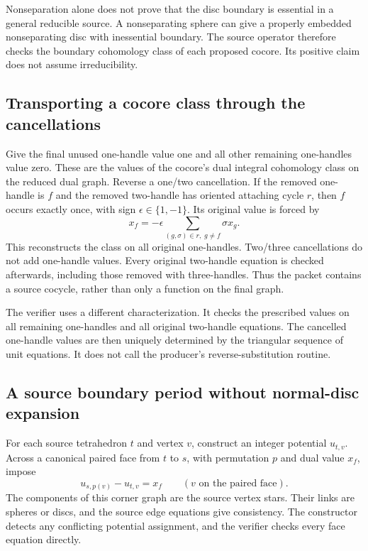 Nonseparation alone does not prove that the disc boundary is essential in a
general reducible source. A nonseparating sphere can give a properly embedded
nonseparating disc with inessential boundary. The source operator therefore
checks the boundary cohomology class of each proposed cocore. Its positive
claim does not assume irreducibility.

\subsection{Transporting a cocore class through the cancellations}

Give the final unused one-handle value one and all other remaining
one-handles value zero. These are the values of the cocore's dual integral
cohomology class on the reduced dual graph. Reverse a one/two cancellation.
If the removed one-handle is $f$ and the removed two-handle has oriented
attaching cycle $r$, then $f$ occurs exactly once, with sign
$\epsilon\in\{1,-1\}$. Its original value is forced by
\[
 x_f=-\epsilon\sum_{(g,\sigma)\in r,\;g\ne f}\sigma x_g.
\]
This reconstructs the class on all original one-handles. Two/three
cancellations do not add one-handle values. Every original two-handle
equation is checked afterwards, including those removed with three-handles.
Thus the packet contains a source cocycle, rather than only a function on
the final graph.

The verifier uses a different characterization. It checks the prescribed
values on all remaining one-handles and all original two-handle equations.
The cancelled one-handle values are then uniquely determined by the
triangular sequence of unit equations. It does not call the producer's
reverse-substitution routine.

\subsection{A source boundary period without normal-disc expansion}

For each source tetrahedron $t$ and vertex $v$, construct an integer potential
$u_{t,v}$. Across a canonical paired face from $t$ to $s$, with permutation
$p$ and dual value $x_f$, impose
\[
 u_{s,p(v)}-u_{t,v}=x_f\qquad(v\text{ on the paired face}).
\]
The components of this corner graph are the source vertex stars. Their
links are spheres or discs, and the source edge equations give consistency.
The constructor detects any conflicting potential assignment, and the
verifier checks every face equation directly.

